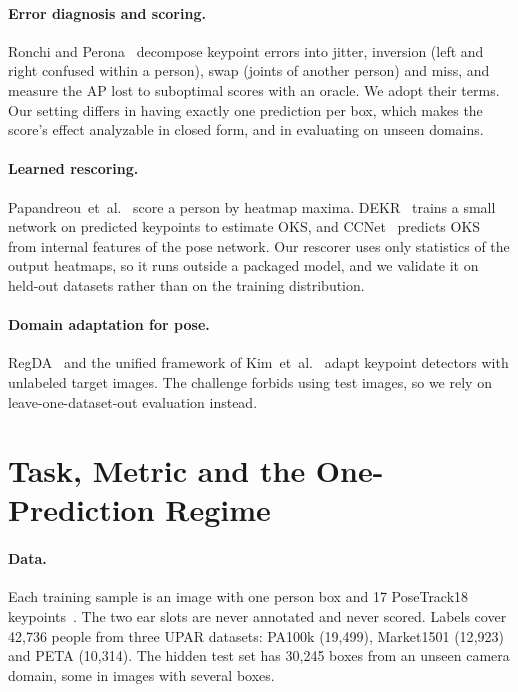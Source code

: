\documentclass[10pt,twocolumn,letterpaper]{article}
\newcommand{\etal}{et~al.}
\begin{document}
\paragraph{Error diagnosis and scoring.} Ronchi and Perona~\cite{ronchi} decompose keypoint errors into jitter, inversion (left and right confused within a person), swap (joints of another person) and miss, and measure the AP lost to suboptimal scores with an oracle. We adopt their terms. Our setting differs in having exactly one prediction per box, which makes the score's effect analyzable in closed form, and in evaluating on unseen domains.

\paragraph{Learned rescoring.} Papandreou~\etal~\cite{gpose} score a person by heatmap maxima. DEKR~\cite{dekr} trains a small network on predicted keypoints to estimate OKS, and CCNet~\cite{ccnet} predicts OKS from internal features of the pose network. Our rescorer uses only statistics of the output heatmaps, so it runs outside a packaged model, and we validate it on held-out datasets rather than on the training distribution.

\paragraph{Domain adaptation for pose.} RegDA~\cite{regda} and the unified framework of Kim~\etal~\cite{kim2022} adapt keypoint detectors with unlabeled target images. The challenge forbids using test images, so we rely on leave-one-dataset-out evaluation instead.

\section{Task, Metric and the One-Prediction Regime}
\label{sec:task}

\paragraph{Data.} Each training sample is an image with one person box and 17 PoseTrack18 keypoints~\cite{posetrack}. The two ear slots are never annotated and never scored. Labels cover 42{,}736 people from three UPAR datasets: PA100k (19{,}499), Market1501 (12{,}923) and PETA (10{,}314). The hidden test set has 30{,}245 boxes from an unseen camera domain, some in images with several boxes.
\end{document}
